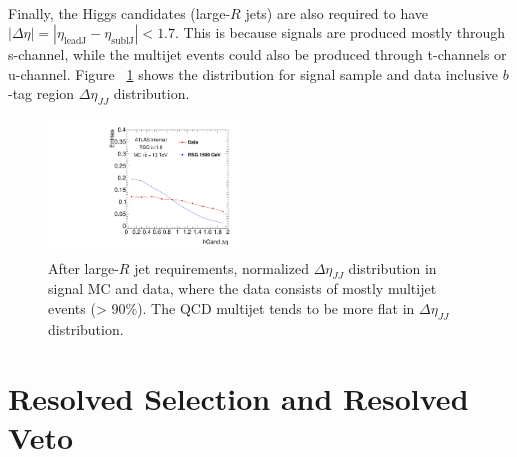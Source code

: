 \paragraph{}
Finally, the Higgs candidates (large-$R$ jets) are also required to have $|\Delta\eta| = |\eta_{\text{leadJ}} -\eta_{\text{sublJ}} |< 1.7$. This is because signals are produced mostly through s-channel, while the multijet events could also be produced through t-channels or u-channel. Figure ~\ref{fig:app-check-deta} shows the distribution for signal sample and data inclusive $b$-tag region $\Delta \eta_{JJ}$ distribution.

\begin{figure}
\begin{center}
  \includegraphics[width=0.45\textwidth,angle=-90]{figures/boosted/Other/AllTag_Signal_hCandDeta_F_c10-cb-no-deta-cut_truth_0.pdf}
  \caption{ After large-$R$ jet requirements, normalized $\Delta \eta_{JJ}$ distribution in signal MC and data, where the data consists of mostly multijet events (> 90$\%$). The QCD multijet tends to be more flat in $\Delta \eta_{JJ}$ distribution.}
\label{fig:app-check-deta}
\end{center}
\end{figure}


\section{Resolved Selection and Resolved Veto}
\label{sec:resollvedveto}

